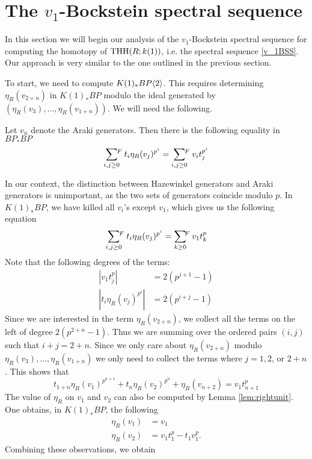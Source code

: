 
\section{The $v_1$-Bockstein spectral sequence}

In this section we will begin our analysis of the $v_1$-Bockstein spectral sequence for computing the homotopy of $\operatorname{THH}(R;k(1))$, i.e. the spectral sequence \eqref{v_1BSS}. Our approach is very similar to the one outlined in the previous section.

To start, we need to compute $K(1)_*BP\langle 2 \rangle$. This requires determining $\eta_R(v_{2+n})$ in $K(1)_*BP$ modulo the ideal generated by $(\eta_R(v_3), \ldots, \eta_R(v_{1+n}))$. We will need the following. 

\begin{lem}\label{lem:rightunit}{\cite[Lemma A.2.2.5]{greenbook}} Let $v_n$ denote the Araki generators. Then there is the following equality in $BP_*BP$
\[
\sum_{i,j\geq 0}\hspace{-5pt}\mbox{}^F\: t_i\eta_R(v_j)^{p^i}=\sum_{i,j\geq 0}\hspace{-5pt}\mbox{}^F\:v_it_j^{p^i}
\]
\end{lem}

In our context, the distinction between Hazewinkel generators and Araki generators is unimportant, as the two sets of generators coincide modulo $p$. In $K(1)_*BP$, we have killed all $v_i$'s except $v_1$, which gives us the following equation
\[
\sum_{i,j\geq 0}\hspace{-5pt}\mbox{}^F\: t_i\eta_R(v_j)^{p^i}=\sum_{k\geq 0}\hspace{-4pt}\mbox{}^F\:v_1t_k^{p}
\]
Note that the following degrees of the terms:
\begin{align*}
	|v_1t_j^p|&= 2(p^{j+1}-1)\\
	|t_i\eta_R(v_j)^{p^i}|&= 2(p^{i+j}-1)
\end{align*}
Since we are interested in the term $\eta_R(v_{2+n})$, we collect all the terms on the left of degree $2(p^{2+n}-1)$. Thus we are summing over the ordered pairs $(i,j)$ such that $i+j=2+n$. Since we only care about $\eta_R(v_{2+n})$ modulo $\eta_R(v_3), \ldots, \eta_R(v_{1+n})$ we only need to collect the terms where $j=1, 2$, or $2+n$. This shows that 
\[
t_{1+n}\eta_R(v_1)^{p^{n+1}}+t_n\eta_R(v_2)^{p^n}+\eta_R(v_{n+2})=v_1t_{n+1}^p
\]
The value of $\eta_R$ on $v_1$ and $v_2$ can also be computed by Lemma \ref{lem:rightunit}. One obtains, in $K(1)_*BP$, the following
\begin{align*}
\eta_R(v_1)&=v_1\\
\eta_R(v_2)&=v_1t_1^p-t_1v_1^p.
\end{align*}
Combining these observations, we obtain

